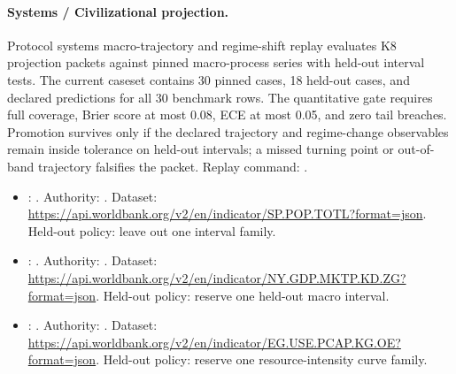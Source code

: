 \paragraph{Systems / Civilizational projection.}
Protocol systems macro-trajectory and regime-shift replay
evaluates K8 projection packets against pinned macro-process series with
held-out interval tests. The current caseset contains 30 pinned cases, 18
held-out cases, and declared predictions for all 30 benchmark rows. The
quantitative gate requires full coverage, Brier score at most 0.08, ECE at
most 0.05, and zero tail breaches. Promotion survives only if the declared
trajectory and regime-change observables remain inside tolerance on held-out
intervals; a missed turning point or out-of-band trajectory falsifies the
packet. Replay command:
.
\begin{itemize}[leftmargin=1.5em,nosep]
\item {}: . Authority: . Dataset: \url{https://api.worldbank.org/v2/en/indicator/SP.POP.TOTL?format=json}. Held-out policy: leave out one interval family.
\item {}: . Authority: . Dataset: \url{https://api.worldbank.org/v2/en/indicator/NY.GDP.MKTP.KD.ZG?format=json}. Held-out policy: reserve one held-out macro interval.
\item {}: . Authority: . Dataset: \url{https://api.worldbank.org/v2/en/indicator/EG.USE.PCAP.KG.OE?format=json}. Held-out policy: reserve one resource-intensity curve family.
\end{itemize}

\endgroup
